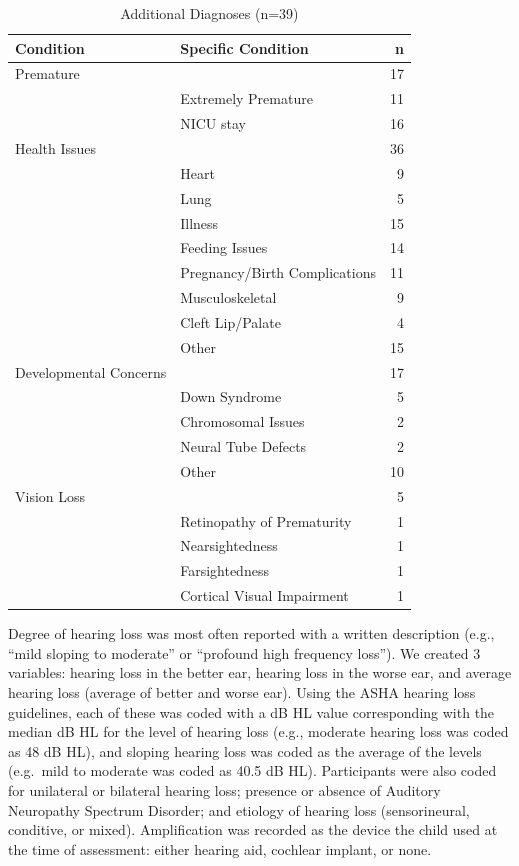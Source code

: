 \documentclass[english,man]{apa6}
\begin{document}
\begin{longtable}[t]{l|l|r}
\caption{\label{tab:comorbid-info}Additional Diagnoses (n=39)}\\
\hline
Condition & Specific Condition & n\\
\hline
Premature &  & 17\\
\hline
 & Extremely Premature & 11\\
\hline
 & NICU stay & 16\\
\hline
Health Issues &  & 36\\
\hline
 & Heart & 9\\
\hline
 & Lung & 5\\
\hline
 & Illness & 15\\
\hline
 & Feeding Issues & 14\\
\hline
 & Pregnancy/Birth Complications & 11\\
\hline
 & Musculoskeletal & 9\\
\hline
 & Cleft Lip/Palate & 4\\
\hline
 & Other & 15\\
\hline
Developmental Concerns &  & 17\\
\hline
 & Down Syndrome & 5\\
\hline
 & Chromosomal Issues & 2\\
\hline
 & Neural Tube Defects & 2\\
\hline
 & Other & 10\\
\hline
Vision Loss &  & 5\\
\hline
 & Retinopathy of Prematurity & 1\\
\hline
 & Nearsightedness & 1\\
\hline
 & Farsightedness & 1\\
\hline
 & Cortical Visual Impairment & 1\\
\hline
\end{longtable}

Degree of hearing loss was most often reported with a written description (e.g., \enquote{mild sloping to moderate} or \enquote{profound high frequency loss}). We created 3 variables: hearing loss in the better ear, hearing loss in the worse ear, and average hearing loss (average of better and worse ear). Using the ASHA hearing loss guidelines, each of these was coded with a dB HL value corresponding with the median dB HL for the level of hearing loss (e.g., moderate hearing loss was coded as 48 dB HL), and sloping hearing loss was coded as the average of the levels (e.g.~mild to moderate was coded as 40.5 dB HL). Participants were also coded for unilateral or bilateral hearing loss; presence or absence of Auditory Neuropathy Spectrum Disorder; and etiology of hearing loss (sensorineural, conditive, or mixed). Amplification was recorded as the device the child used at the time of assessment: either hearing aid, cochlear implant, or none.
\end{document}
